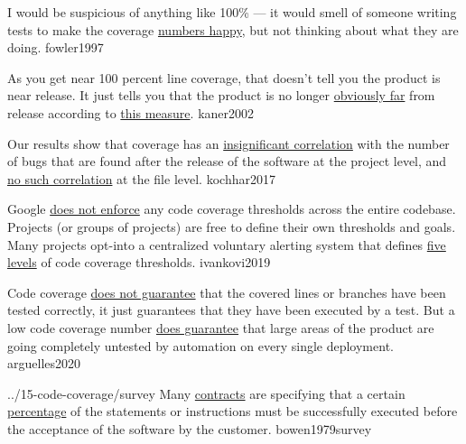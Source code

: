 \documentclass{article}
\begin{document}
  {I would be suspicious of anything like 100\% --- it would smell of someone writing tests to make the coverage \ul{numbers happy}, but not thinking about what they are doing.}
  {fowler1997}

  {As you get near 100 percent line coverage, that doesn't tell you the product is near release. It just tells you that the product is no longer \ul{obviously far} from release according to \ul{this measure}.}
  {kaner2002}

  {Our results show that coverage has an \ul{insignificant correlation} with the number of bugs that are found after the release of the software at the project level, and \ul{no such correlation} at the file level.}
  {kochhar2017}

  {Google \ul{does not enforce} any code coverage thresholds across the entire codebase. Projects (or groups of projects) are free to define their own thresholds and goals. Many projects opt-into a centralized voluntary alerting system that defines \ul{five levels} of code coverage thresholds.}
  {ivankovi2019}



  {Code coverage \ul{does not guarantee} that the covered lines or branches have been tested correctly, it just guarantees that they have been executed by a test. But a low code coverage number \ul{does guarantee} that large areas of the product are going completely untested by automation on every single deployment.}
  {arguelles2020}

\lnQuote
  {../15-code-coverage/survey}
  {Many \ul{contracts} are specifying that a certain \ul{percentage} of the statements or instructions must be successfully executed before the acceptance of the software by the customer.}
  {bowen1979survey}
\end{document}
